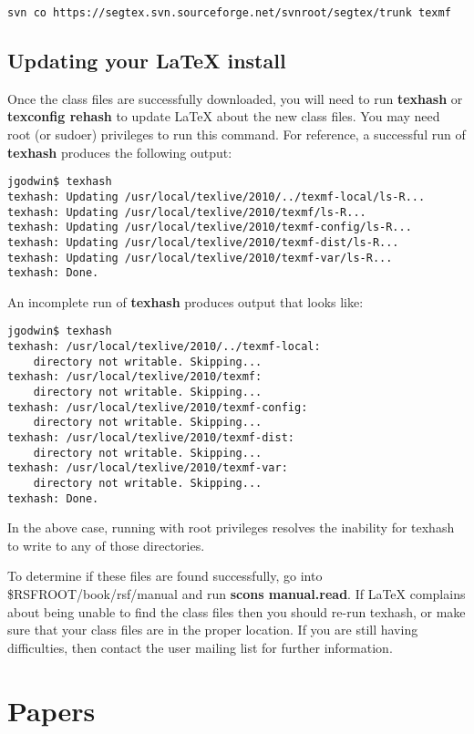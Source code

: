 \begin{verbatim}
svn co https://segtex.svn.sourceforge.net/svnroot/segtex/trunk texmf 
\end{verbatim}

\subsection{Updating your LaTeX install}

Once the class files are successfully downloaded, you will need to run \textbf{texhash} or \textbf{texconfig rehash} to update LaTeX about the new class files.   You may need root (or sudoer) privileges to run this command.  For reference, a successful run of \textbf{texhash} produces the following output:

\begin{verbatim}
jgodwin$ texhash
texhash: Updating /usr/local/texlive/2010/../texmf-local/ls-R... 
texhash: Updating /usr/local/texlive/2010/texmf/ls-R... 
texhash: Updating /usr/local/texlive/2010/texmf-config/ls-R... 
texhash: Updating /usr/local/texlive/2010/texmf-dist/ls-R... 
texhash: Updating /usr/local/texlive/2010/texmf-var/ls-R... 
texhash: Done.
\end{verbatim}

An incomplete run of \textbf{texhash} produces output that looks like:
\begin{verbatim}
jgodwin$ texhash
texhash: /usr/local/texlive/2010/../texmf-local: 
	directory not writable. Skipping...
texhash: /usr/local/texlive/2010/texmf: 
	directory not writable. Skipping...
texhash: /usr/local/texlive/2010/texmf-config: 
	directory not writable. Skipping...
texhash: /usr/local/texlive/2010/texmf-dist: 
	directory not writable. Skipping...
texhash: /usr/local/texlive/2010/texmf-var: 
	directory not writable. Skipping...
texhash: Done.
\end{verbatim}
In the above case, running with root privileges resolves the inability for texhash to write to any of those directories.

To determine if these files are found successfully, go into \$RSFROOT/book/rsf/manual and run \textbf{scons manual.read}.  If LaTeX complains about being unable to find the class files then you should re-run texhash, or make sure that your class files are in the proper location.  If you are still having difficulties, then contact the user mailing list for further information.

\section{Papers}

